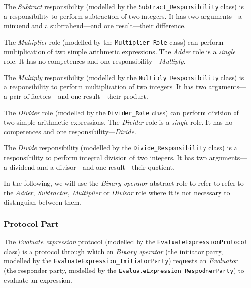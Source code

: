 The \textit{Subtract} responsibility (modelled by the \texttt{Subtract\_Responsibility} class) is a responsibility to perform subtraction of two integers.
It has two arguments---a minuend and a subtrahend---and one result---their difference.

The \textit{Multiplier} role (modelled by the \texttt{Multiplier\_Role} class) can perform multiplication of two simple arithmetic expressions.
The \textit{Adder} role is a \textit{single} role.
It has no competences and one responsibility---\textit{Multiply}.

The \textit{Multiply} responsibility (modelled by the \texttt{Multiply\_Responsibility} class) is a responsibility to perform multiplication of two integers.
It has two arguments---a pair of factors---and one result---their product.

The \textit{Divider} role (modelled by the \texttt{Divider\_Role} class) can perform division of two simple arithmetic expressions.
The \textit{Divider} role is a \textit{single} role.
It has no competences and one responsibility---\textit{Divide}. 

The \textit{Divide} responsibility (modelled by the \texttt{Divide\_Responsibility} class) is a responsibility to perform integral division of two integers.
It has two arguments---a dividend and a divisor---and one result---their quotient.

In the following, we will use the \textit{Binary operator} abstract role to refer to refer to the \textit{Adder}, \textit{Subtractor}, \textit{Multiplier} or \textit{Divisor} role where it is not necessary to distinguish between them.

\subsubsection*{Protocol Part}

The \textit{Evaluate expression} protocol (modelled by the \texttt{EvaluateExpressionProtocol} class) is a protocol through which an \textit{Binary operator} (the initiator party, modelled by the \texttt{EvaluateExpression\_InitiatorParty}) requests an \textit{Evaluator} (the responder party, modelled by the \texttt{EvaluateExpression\_RespodnerParty}) to evaluate an expression.

